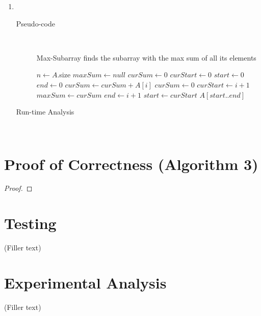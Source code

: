 \documentclass[paper=a4, fontsize=11pt]{scrartcl} %
\numberwithin{equation}{section} %
\numberwithin{figure}{section} %
\numberwithin{table}{section} %
\begin{document}
\begin{enumerate}[label=\bfseries Algorithm \arabic*:]
    \item \hfill \\
    \begin{description}
        \item[Pseudo-code] \hfill \\
        \begin{algorithmc}
            \caption{Max-Subarray finds the subarray with the max sum of all its elements}
                \State $n \gets A$.size
                \State $maxSum \gets null$
                \State $curSum \gets 0$
                \State $curStart \gets 0$
                \State $start \gets 0$
                \State $end \gets 0$
                    \State $curSum \gets curSum + A[i]$
                        \State $curSum \gets 0$
                        \State $curStart \gets i + 1$
                    \EndIf
                        \State $maxSum \gets curSum$
                        \State $end \gets i + 1$
                        \State $start \gets curStart$
                    \EndIf
                \EndFor
                \State \Return $A[start..end]$
            \EndFunction
        \end{algorithmc}
        \item[Run-time Analysis] \hfill \\
    \end{description}
\end{enumerate}

\section{Proof of Correctness (Algorithm 3)}
\begin{proof}
\end{proof}

\section{Testing}
(Filler text)

\section{Experimental Analysis}
(Filler text)
\end{document}
